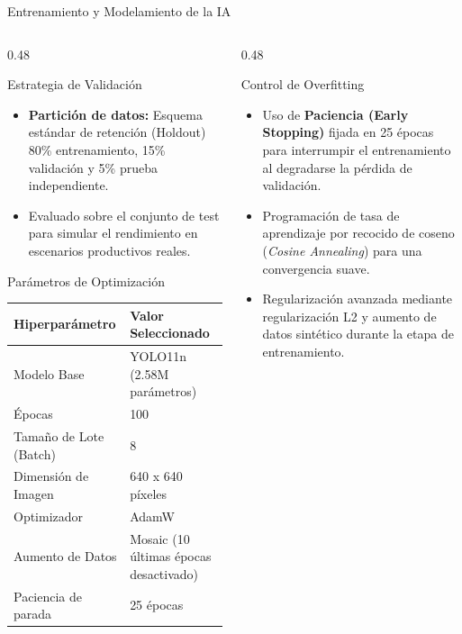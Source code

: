 \documentclass[10pt,aspectratio=169]{beamer}
\begin{document}
\begin{frame}{Entrenamiento y Modelamiento de la IA}
  \begin{columns}[T]
    \begin{column}{0.48\textwidth}
      \begin{block}{Estrategia de Validación}
        \small
        \begin{itemize}
          \item \textbf{Partición de datos:} Esquema estándar de retención (Holdout) 80\% entrenamiento, 15\% validación y 5\% prueba independiente.
          \item Evaluado sobre el conjunto de test para simular el rendimiento en escenarios productivos reales.
        \end{itemize}
      \end{block}
      \begin{block}{Parámetros de Optimización}
        \scriptsize
        \begin{tabular}{ll}
          \toprule
          \textbf{Hiperparámetro} & \textbf{Valor Seleccionado} \\
          \midrule
          Modelo Base & YOLO11n (2.58M parámetros) \\
          Épocas & 100 \\
          Tamaño de Lote (Batch) & 8 \\
          Dimensión de Imagen & 640 x 640 píxeles \\
          Optimizador & AdamW \\
          Aumento de Datos & Mosaic (10 últimas épocas desactivado) \\
          Paciencia de parada & 25 épocas \\
          \bottomrule
        \end{tabular}
      \end{block}
    \end{column}
    
    \begin{column}{0.48\textwidth}
      \begin{block}{Control de Overfitting}
        \small
        \begin{itemize}
          \item Uso de \textbf{Paciencia (Early Stopping)} fijada en 25 épocas para interrumpir el entrenamiento al degradarse la pérdida de validación.
          \item Programación de tasa de aprendizaje por recocido de coseno (\textit{Cosine Annealing}) para una convergencia suave.
          \item Regularización avanzada mediante regularización L2 y aumento de datos sintético durante la etapa de entrenamiento.
        \end{itemize}
      \end{block}
    \end{column}
  \end{columns}
\end{frame}
\end{document}
